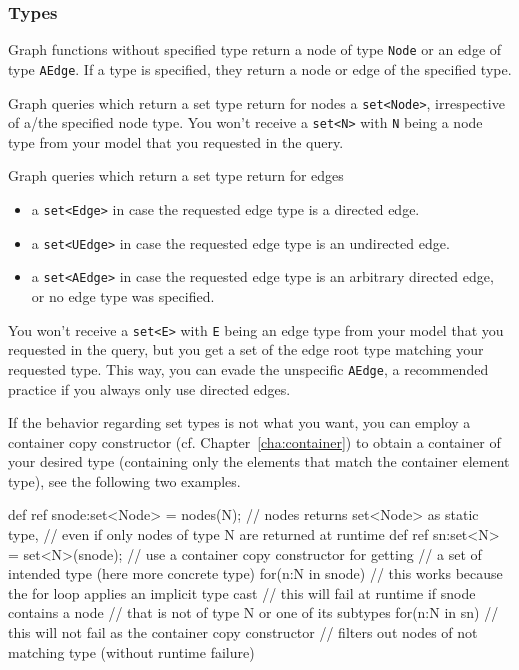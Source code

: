 \subsubsection*{Types}
Graph functions without specified type return a node of type \texttt{Node} or an edge of type \texttt{AEdge}. 
If a type is specified, they return a node or edge of the specified type.

Graph queries which return a set type return for nodes a \texttt{set<Node>}, irrespective of a/the specified node type. 
You won't receive a \texttt{set<N>} with \texttt{N} being a node type from your model that you requested in the query.

Graph queries which return a set type return for edges
\begin{itemize}
	\item a \texttt{set<Edge>} in case the requested edge type is a directed edge.
	\item a \texttt{set<UEdge>} in case the requested edge type is an undirected edge.
	\item a \texttt{set<AEdge>} in case the requested edge type is an arbitrary directed edge, \\or no edge type was specified.
\end{itemize}
You won't receive a \texttt{set<E>} with \texttt{E} being an edge type from your model that you requested in the query, but you get a set of the edge root type matching your requested type. 
This way, you can evade the unspecific \texttt{AEdge}, a recommended practice if you always only use directed edges.

If the behavior regarding set types is not what you want, you can employ a container copy constructor (cf. Chapter~\ref{cha:container}) to obtain a container of your desired type (containing only the elements that match the container element type), see the following two examples.

\begin{example}
\begin{grgen}
def ref snode:set<Node> = nodes(N); // nodes returns set<Node> as static type,
                                    // even if only nodes of type N are returned at runtime
def ref sn:set<N> = set<N>(snode); // use a container copy constructor for getting
                                   // a set of intended type (here more concrete type)
for(n:N in snode) { // this works because the for loop applies an implicit type cast
                    // this will fail at runtime if snode contains a node
                    // that is not of type N or one of its subtypes
}
for(n:N in sn) { // this will not fail as the container copy constructor 
                 // filters out nodes of not matching type (without runtime failure)
}
\end{grgen}
\end{example}

